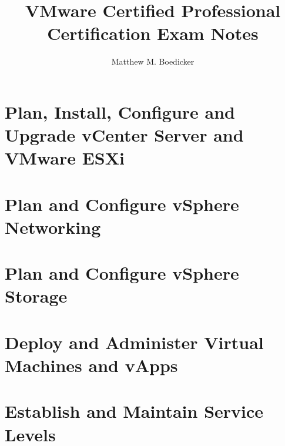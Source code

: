 \documentclass{article}
\begin{document}
\title{VMware Certified Professional Certification Exam Notes}
\author{Matthew M. Boedicker}

\maketitle

\tableofcontents

\section{Plan, Install, Configure and Upgrade vCenter Server and VMware ESXi}







\section{Plan and Configure vSphere Networking}






\section{Plan and Configure vSphere Storage}





\section{Deploy and Administer Virtual Machines and vApps}






\section{Establish and Maintain Service Levels}
\end{document}
